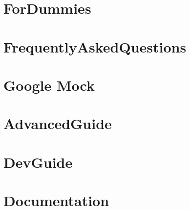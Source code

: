 \documentclass[twoside]{book}
\newcommand{\+}{\discretionary{\mbox{\scriptsize$\hookleftarrow$}}{}{}}
\begin{document}
\chapter{For\+Dummies}
\label{md__home_bhargavi_Documents_SDR_Copy_Exam_808X_vendor_googletest_googlemock_docs_v1_7_ForDummies}
\hypertarget{md__home_bhargavi_Documents_SDR_Copy_Exam_808X_vendor_googletest_googlemock_docs_v1_7_ForDummies}{}

\chapter{Frequently\+Asked\+Questions}
\label{md__home_bhargavi_Documents_SDR_Copy_Exam_808X_vendor_googletest_googlemock_docs_v1_7_FrequentlyAskedQuestions}
\hypertarget{md__home_bhargavi_Documents_SDR_Copy_Exam_808X_vendor_googletest_googlemock_docs_v1_7_FrequentlyAskedQuestions}{}

\chapter{Google Mock}
\label{md__home_bhargavi_Documents_SDR_Copy_Exam_808X_vendor_googletest_googlemock_README}
\hypertarget{md__home_bhargavi_Documents_SDR_Copy_Exam_808X_vendor_googletest_googlemock_README}{}

\chapter{Advanced\+Guide}
\label{md__home_bhargavi_Documents_SDR_Copy_Exam_808X_vendor_googletest_googletest_docs_AdvancedGuide}
\hypertarget{md__home_bhargavi_Documents_SDR_Copy_Exam_808X_vendor_googletest_googletest_docs_AdvancedGuide}{}

\chapter{Dev\+Guide}
\label{md__home_bhargavi_Documents_SDR_Copy_Exam_808X_vendor_googletest_googletest_docs_DevGuide}
\hypertarget{md__home_bhargavi_Documents_SDR_Copy_Exam_808X_vendor_googletest_googletest_docs_DevGuide}{}

\chapter{Documentation}
\label{md__home_bhargavi_Documents_SDR_Copy_Exam_808X_vendor_googletest_googletest_docs_Documentation}
\hypertarget{md__home_bhargavi_Documents_SDR_Copy_Exam_808X_vendor_googletest_googletest_docs_Documentation}{}

\end{document}
